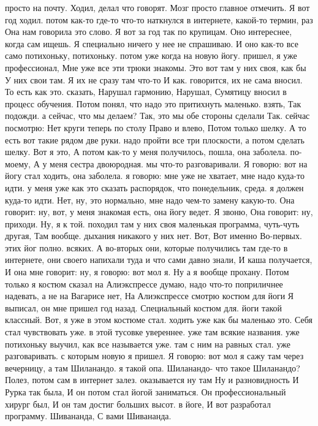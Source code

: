 просто на почту.
Ходил, делал что говорят.
Мозг просто главное отмечить.
Я вот год ходил. потом как-то где-то что-то наткнулся в интернете, какой-то термин, раз Она нам говорила это слово.
Я вот за год так по крупицам.
Оно интереснее, когда сам ищешь.
Я специально ничего у нее не спрашиваю.
И оно как-то все само потихоньку, потихоньку. потом уже когда
на новую йогу.
пришел, я уже профессионал, Мне уже все эти трюки знакомы. Это вот там у них своя, как бы У них свои там. Я их не сразу там что-то И как.
говорится, их не сама вносил. То есть как это.
сказать, Нарушал гармонию, Нарушал, Сумятицу вносил в процесс обучения. Потом понял, что надо это притихнуть маленько.
взять, Так подожди. а сейчас, что мы делаем?
Так, это мы обе стороны сделали Так.
сейчас посмотрю: Нет круги теперь по столу Право и влево, Потом только шелку.
А то есть вот такие рядом две руки. надо пройти все три плоскости, а потом сделать шелку.
Вот я это, А потом как-то у меня получилось, пошла, она заболела.
по-моему, А у меня сестра
двоюродная. мы что-то разговаривали. Я говорю: вот на йогу стал ходить, она заболела. я говорю: мне уже не хватает, мне надо куда-то идти. у меня уже как это сказать распорядок, что понедельник, среда.
я должен куда-то идти.
Нет, ну, это нормально, мне надо чем-то замену какую-то. Она говорит: ну, вот, у меня знакомая есть, она йогу ведет. Я звоню, Она говорит: ну, приходи.
Ну, я к той.
походил там у них своя маленькая программа, чуть-чуть другая, Там вообще.
дыхания никакого у них нет.
Вот, Вот именно Во-первых.
этих йог полно.
всяких. А во-вторых они, которые получились там где-то в интернете, они своего напихали туда и что сами давно знали, И каша получается, И она мне говорит: ну, я говорю:
вот мол я.
Ну а я вообще прохану. Потом только я костюм сказал на Алиэкспрессе думаю, надо что-то поприличнее надевать, а не на Вагарисе нет, На Алиэкспрессе смотрю костюм для йоги Я выписал, он мне пришел год назад.
Специальный костюм для.
йоги такой классный. Вот, я уже в этом костюме стал.
ходить уже как бы маленько это.
Себя стал чувствовать уже.
в этой тусовке увереннее. уже там всякие названия.
уже потихоньку выучил, как все называется уже.
там с ним на равных стал.
уже разговаривать. с которым новую я пришел. Я говорю: вот мол я сажу там через вечерницу, а там Шиланандо.
я такой опа.
Шиланандо- что такое Шиланандо? Полез, потом сам в интернет залез.
оказывается ну там Ну и разновидность И Рурка так была, И он потом стал йогой заниматься. Он профессиональный хирург был, И он там достиг больших высот.
в йоге, И вот разработал программу.
Шивананда, С вами Шивананда.
